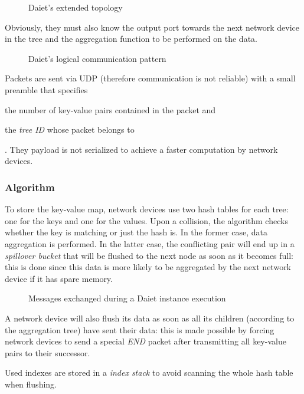 \begin{figure}[!htb]
    \centering
    \usebox{\daietextended}
    \caption{Daiet's \texorpdfstring{\cite{daiet}}{} extended topology}
\end{figure}

Obviously, they must also know the output port towards the next network device in the tree and the aggregation function to be performed on the data.

\begin{figure}[!htb]
    \centering
    \usebox{\daietcommunication}
    \caption{Daiet's \texorpdfstring{\cite{daiet}}{} logical communication pattern}
\end{figure}

Packets are sent via UDP (therefore communication is not reliable) with a small preamble that specifies
\begin{mylist}
    \item the number of key-value pairs contained in the packet and
    \item the \textit{tree ID} whose packet belongs to
\end{mylist}.
They payload is not serialized to achieve a faster computation by network devices.

\subsubsection{Algorithm} \label{daiet_algorithm}
To store the key-value map, network devices use two hash tables for each tree: one for the keys and one for the values.
Upon a collision, the algorithm checks whether the key is matching or just the hash is.
In the former case, data aggregation is performed.
In the latter case, the conflicting pair will end up in a \textit{spillover bucket} that will be flushed to the next node as soon as it becomes full: this is done since this data is more likely to be aggregated by the next network device if it has spare memory.

\begin{figure}[!htb]
    \centering
    \usebox{\daietsd}
    \caption{Messages exchanged during a Daiet \texorpdfstring{\cite{daiet}}{} instance execution}
\end{figure}

A network device will also flush its data as soon as all its children (according to the aggregation tree) have sent their data: this is made possible by forcing network devices to send a special \textit{END} packet after transmitting all key-value pairs to their successor.\par
Used indexes are stored in a \textit{index stack} to avoid scanning the whole hash table when flushing.

